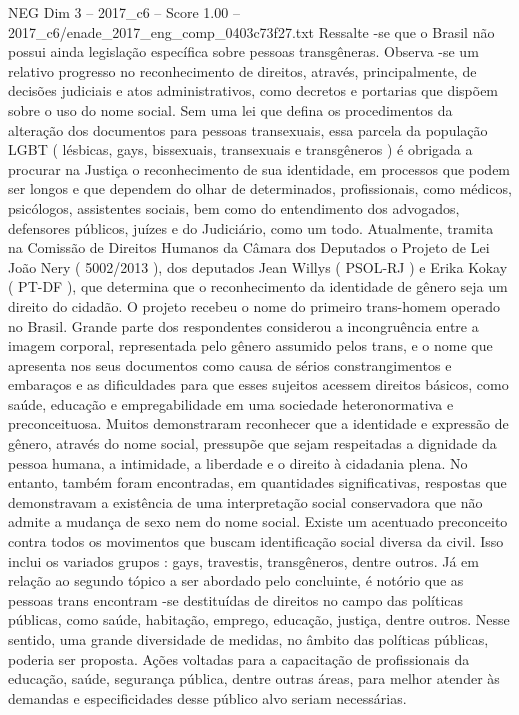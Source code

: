 \begin{textsample}{NEG Dim 3 – 2017\_c6 – Score 1.00 – 2017\_c6/enade\_2017\_eng\_comp\_0403c73f27.txt}
Ressalte -se que o Brasil não possui ainda legislação específica sobre pessoas transgêneras.
Observa -se um relativo progresso no reconhecimento de direitos, através, principalmente, de decisões judiciais e atos administrativos, como decretos e portarias que dispõem sobre o uso do nome social.
Sem uma lei que defina os procedimentos da alteração dos documentos para pessoas transexuais, essa parcela da população LGBT ( lésbicas, gays, bissexuais, transexuais e transgêneros ) é obrigada a procurar na Justiça o reconhecimento de sua identidade, em processos que podem ser longos e que dependem do olhar de determinados, profissionais, como médicos, psicólogos, assistentes sociais, bem como do entendimento dos advogados, defensores públicos, juízes e do Judiciário, como um todo.
Atualmente, tramita na Comissão de Direitos Humanos da Câmara dos Deputados o Projeto de Lei João Nery ( 5002/2013 ), dos deputados Jean Willys ( PSOL-RJ ) e Erika Kokay ( PT-DF ), que determina que o reconhecimento da identidade de gênero seja um direito do cidadão.
O projeto recebeu o nome do primeiro trans-homem operado no Brasil.
Grande parte dos respondentes considerou a incongruência entre a imagem corporal, representada pelo gênero assumido pelos trans, e o nome que apresenta nos seus documentos como causa de sérios constrangimentos e embaraços e as dificuldades para que esses sujeitos acessem direitos básicos, como saúde, educação e empregabilidade em uma sociedade heteronormativa e preconceituosa.
Muitos demonstraram reconhecer que a identidade e expressão de gênero, através do nome social, pressupõe que sejam respeitadas a dignidade da pessoa humana, a intimidade, a liberdade e o direito à cidadania plena.
No entanto, também foram encontradas, em quantidades significativas, respostas que demonstravam a existência de uma interpretação social conservadora que não admite a mudança de sexo nem do nome social.
Existe um acentuado preconceito contra todos os movimentos que buscam identificação social diversa da civil.
Isso inclui os variados grupos : gays, travestis, transgêneros, dentre outros.
Já em relação ao segundo tópico a ser abordado pelo concluinte, é notório que as pessoas trans encontram -se destituídas de direitos no campo das políticas públicas, como saúde, habitação, emprego, educação, justiça, dentre outros.
Nesse sentido, uma grande diversidade de medidas, no âmbito das políticas públicas, poderia ser proposta.
Ações voltadas para a capacitação de profissionais da educação, saúde, segurança pública, dentre outras áreas, para melhor atender às demandas e especificidades desse público alvo seriam necessárias.

\end{textsample}
